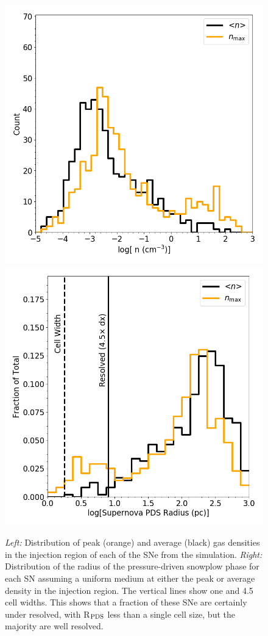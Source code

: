 \documentclass[twocolumn]{aastex61}
\begin{document}
\begin{figure}
\centering
\includegraphics[width=0.4\linewidth]{sn_density_hist}
\includegraphics[width=0.4\linewidth]{sn_radius_hist}
\caption{{\em Left:} Distribution of peak (orange) and average (black) gas densities in the injection region of each of the SNe from the simulation. {\em Right:} Distribution of the radius of the pressure-driven snowplow phase for each SN assuming a uniform medium at either the peak or average density in the injection region. The vertical lines show one and 4.5 cell widths. This shows that a fraction of these SNe are certainly under resolved, with R$_{\rm PDS}$ less than a single cell size, but the majority are well resolved.}
\label{fig:SN histogram}
\end{figure}

%
%
\end{document}
